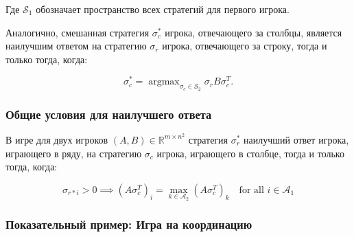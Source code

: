 Где \(\mathcal{S}_1\) обозначает пространство всех
стратегий для первого
игрока.

Аналогично, смешанная стратегия \(\sigma_c^*\) игрока, отвечающего за столбцы, является наилучшим
ответом на стратегию \(\sigma_r\) игрока, отвечающего за строку, тогда и только тогда, когда:

\begin{equation}
\sigma_c^* = \operatorname{argmax}_{\sigma_c \in \mathcal{S}_2} \sigma_r B \sigma_c^T.
\end{equation}


\subsubsection*{Общие условия для наилучшего ответа}

В игре для двух игроков \( (A, B) \in \mathbb{R}^{m \times n^2} \) стратегия \( \sigma_r^* \) наилучший ответ игрока, играющего в ряду, на стратегию \( \sigma_c \) игрока, играющего в столбце, тогда и только тогда, когда:

\begin{equation}
\sigma_{r*i} > 0 \implies (A \sigma_c^T)_i = \max_{k \in \mathcal{A}_2} (A \sigma_c^T)_k \quad \text{for all } i \in \mathcal{A}_1
\end{equation}

\subsubsection*{Показательный пример: Игра на координацию}


